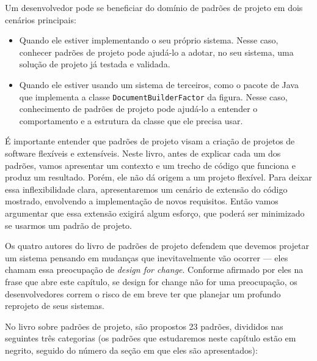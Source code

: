 \documentclass[
  11pt,
  twoside]{book}
\newcommand{\passthrough}[1]{#1}
\begin{document}
Um desenvolvedor pode se beneficiar do domínio de padrões de projeto em
dois cenários principais:

\begin{itemize}
\item
  Quando ele estiver implementando o seu próprio sistema. Nesse caso,
  conhecer padrões de projeto pode ajudá-lo a adotar, no seu sistema,
  uma solução de projeto já testada e validada.
\item
  Quando ele estiver usando um sistema de terceiros, como o pacote de
  Java que implementa a classe
  \passthrough{\lstinline!DocumentBuilderFactor!} da figura. Nesse caso,
  conhecimento de padrões de projeto pode ajudá-lo a entender o
  comportamento e a estrutura da classe que ele precisa usar.
\end{itemize}

É importante entender que padrões de projeto visam a criação de projetos
de software flexíveis e extensíveis. Neste livro, antes de explicar cada
um dos padrões, vamos apresentar um contexto e um trecho de código que
funciona e produz um resultado. Porém, ele não dá origem a um projeto
flexível. Para deixar essa inflexibilidade clara, apresentaremos um
cenário de extensão do código mostrado, envolvendo a implementação de
novos requisitos. Então vamos argumentar que essa extensão exigirá algum
esforço, que poderá ser minimizado se usarmos um padrão de projeto.

 Os quatro autores do livro de padrões de
projeto defendem que devemos projetar um sistema pensando em mudanças
que inevitavelmente vão ocorrer --- eles chamam essa preocupação de
\emph{design for change}. Conforme afirmado por eles na frase que abre
este capítulo, se design for change não for uma preocupação, os
desenvolvedores correm o risco de em breve ter que planejar um profundo
reprojeto de seus sistemas.

No livro sobre padrões de projeto, são propostos 23 padrões, divididos
nas seguintes três categorias (os padrões que estudaremos neste capítulo
estão em negrito, seguido do número da seção em que eles são
apresentados):
\end{document}
